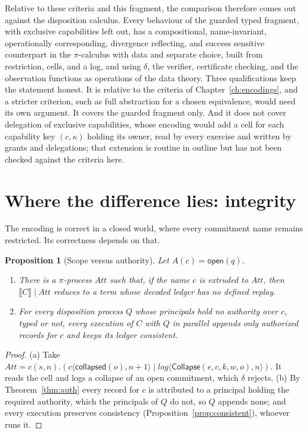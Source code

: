 \documentclass[11pt,openany]{book}
\newtheorem{proposition}[theorem]{Proposition}
\theoremstyle{remark}
\newcommand{\Collapse}{\mathsf{Collapse}}
\begin{document}
Relative to these criteria and this fragment, the comparison therefore
comes out against the disposition calculus. Every behaviour of the guarded
typed fragment, with exclusive capabilities left out, has a
compositional, name-invariant, operationally corresponding, divergence
reflecting, and success sensitive counterpart in the $\pi$-calculus with
data and separate choice, built from restriction, cells, and a log, and
using $\delta$, the verifier, certificate checking, and the observation
functions as operations of the data theory. Three qualifications keep the
statement honest. It is relative to the criteria of
Chapter~\ref{ch:encodings}, and a stricter criterion, such as full
abstraction for a chosen equivalence, would need its own argument. It
covers the guarded fragment only. And it does not cover delegation of
exclusive capabilities, whose encoding would add a cell for each
capability key $(c,\kappa)$ holding its owner, read by every exercise and
written by grants and delegations; that extension is routine in outline
but has not been checked against the criteria here.

\section{Where the difference lies: integrity}

The encoding is correct in a closed world, where every commitment name
remains restricted. Its correctness depends on that.

\begin{proposition}[Scope versus authority]\label{prop:scope}
Let $A(c)=\mathsf{open}(q)$.
\begin{enumerate}[label=(\alph*)]
\item There is a $\pi$-process $\mathit{Att}$ such that, if the name $c$ is
extruded to $\mathit{Att}$, then $\llbracket C\rrbracket\mid\mathit{Att}$
reduces to a term whose decoded ledger has no defined replay.
\item For every disposition process $Q$ whose principals hold no
authority over $c$, typed or not, every execution of $C$ with $Q$ in
parallel appends only authorized records for $c$ and keeps its ledger
consistent.
\end{enumerate}
\end{proposition}

\begin{proof}
(a) Take $\mathit{Att}=c(s,n).(c\langle\mathsf{collapsed}(o),n+1\rangle\mid
\mathit{log}\langle\Collapse(e,c,k,w,o),n\rangle)$. It reads the cell and
logs a collapse of an open commitment, which $\delta$ rejects. (b) By
Theorem~\ref{thm:auth} every record for $c$ is attributed to a principal
holding the required authority, which the principals of $Q$ do not, so
$Q$ appends none; and every execution preserves consistency
(Proposition~\ref{prop:consistent}), whoever runs it.
\end{proof}
\end{document}
